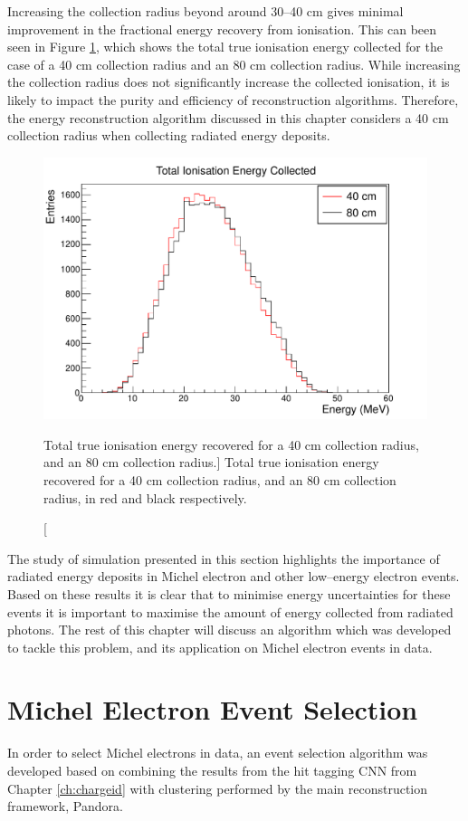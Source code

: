 Increasing the collection radius beyond around 30--40 cm gives minimal
improvement in the fractional energy recovery from ionisation. This can been
seen in Figure \ref{fig:40_v_80}, which shows the total true ionisation energy
collected for the case of a 40 cm collection radius and an 80 cm collection
radius. While increasing the collection radius does not significantly increase
the collected ionisation, it is likely to impact the purity and efficiency of
reconstruction algorithms. Therefore, the energy reconstruction algorithm
discussed in this chapter considers a 40 cm collection radius when collecting
radiated energy deposits.
\begin{figure}
	\centering
	\includegraphics[width=\textwidth]{figures/40_v_80.pdf}
	\caption
	[Total true ionisation energy recovered for a 40 cm collection radius, and an
	80 cm collection radius.]
	{Total true ionisation energy recovered for a 40 cm collection radius, and an
	80 cm collection radius, in red and black respectively.}
	\label{fig:40_v_80}
\end{figure}

The study of \protodune{} simulation presented in this section highlights the 
importance of radiated energy deposits in Michel electron and other 
low--energy electron events. Based on these results it is clear that to 
minimise energy uncertainties for these events it is important to maximise the 
amount of energy collected from radiated photons. The rest of this chapter 
will discuss an algorithm which was developed to tackle this problem, and its 
application on Michel electron events in \protodune{} data.

\section{Michel Electron Event Selection} \label{ME_ES}
In order to select Michel electrons in \protodune{} data, an event selection
algorithm was developed based on combining the results from the hit tagging CNN
from Chapter \ref{ch:chargeid} with clustering performed by the main
\protodune{} reconstruction framework, Pandora.

